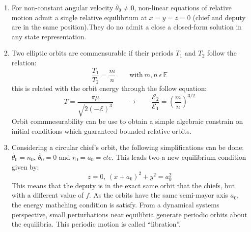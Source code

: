 \documentclass[a4paper]{article}
\begin{document}
\begin{enumerate}[label=\emph{\alph*)}]
  \item %
    For non-constant angular velocity $\ddot{\theta_0} \neq 0$, non-linear equations of relative motion admit a single relative equilibrium at $x=y=z=0$ (chief and deputy are in the same position).They do no admit a close a closed-form solution in any state representation.
  \item %
    Two elliptic orbits are commensurable if their periods $T_1$ and $T_2$ follow the relation:
    \[ \frac{T_1}{T_2}=\frac{m}{n} \qquad \mathrm{with}~m,n~\epsilon~\mathbb{E}\]
    this is related with the orbit energy through the follow equation:
    \[ T = \frac{\pi\mu}{\sqrt{2(-\mathcal{E})^{3}}}\qquad \rightarrow \qquad \frac{\mathcal{E}_2}{\mathcal{E}_1}=\left( \frac{m}{n}\right)^{3/2} \]
    Orbit commnesurability can be use to obtain a simple algebraic constrain on initial conditions which guaranteed bounded relative orbits.
  \item %
    Considering a circular chief's orbit, the following simplifications can be done: $\dot{\theta_0}=n_0$, $\ddot{\theta_0}=0$ and $r_0=a_0=cte$. This leads two a new equilibrium condition given by:
    \[ z = 0,~(x+a_0)^2+y^2 = a_0^2\]
    This means that the deputy is in the exact same orbit that the chiefs, but with a different value of $f$. As the orbits have the same semi-mayor axis $a_0$, the energy mathching condition is satisfy. From a dynamical systems perspective, small perturbations near equilibria generate periodic orbits about the equilibria. This periodic motion is called ``libration''.


\end{enumerate}
\end{document}
